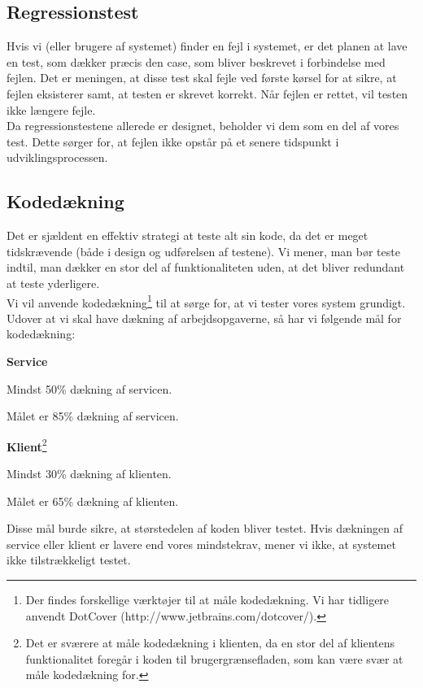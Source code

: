 \subsection{Regressionstest}
\label{Test_intendedStrat_regression}
Hvis vi (eller brugere af systemet) finder en fejl i systemet, er det planen at lave en test, som dækker præcis den case, som bliver beskrevet i forbindelse med fejlen. Det er meningen, at disse test skal fejle ved første kørsel for at sikre, at fejlen eksisterer samt, at testen er skrevet korrekt. Når fejlen er rettet, vil testen ikke længere fejle.
\\Da regressionstestene allerede er designet, beholder vi dem som en del af vores test. Dette sørger for, at fejlen ikke opstår på et senere tidspunkt i udviklingsprocessen.

\subsection{Kodedækning}
\label{Test_intendedStrat_coverage}
Det er sjældent en effektiv strategi at teste alt sin kode, da det er meget tidskrævende (både i design og udførelsen af testene). Vi mener, man bør teste indtil, man dækker en stor del af funktionaliteten uden, at det bliver redundant at teste yderligere. 
\\Vi vil anvende kodedækning\footnote{Der findes forskellige værktøjer til at måle kodedækning. Vi har tidligere anvendt DotCover (http://www.jetbrains.com/dotcover/).} til at sørge for, at vi tester vores system grundigt. Udover at vi skal have dækning af arbejdsopgaverne, så har vi følgende mål for kodedækning:
\begin{my_itemize}
\item \textbf{Service}
\item Mindst 50\% dækning af servicen.
\item Målet er 85\% dækning af servicen.
\item \textbf{Klient}\footnote{Det er sværere at måle kodedækning i klienten, da en stor del af klientens funktionalitet foregår i koden til brugergrænsefladen, som kan være svær at måle kodedækning for.}
\item Mindst 30\% dækning af klienten.
\item Målet er 65\% dækning af klienten. 
\end{my_itemize}

Disse mål burde sikre, at størstedelen af koden bliver testet. Hvis dækningen af service eller klient er lavere end vores mindstekrav, mener vi ikke, at systemet ikke tilstrækkeligt testet.
